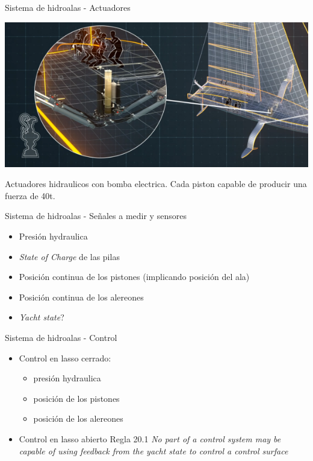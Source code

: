 \documentclass[presentation,aspectratio=169]{beamer}
\begin{document}
\begin{frame}[label={sec:orgcea088c}]{Sistema de hidroalas - Actuadores}

\begin{center}
\includegraphics[height=0.4\textheight]{../../figures/AC75-actuators.png}
\end{center}

Actuadores hidraulicos con bomba electrica. Cada piston capable de producir una fuerza de 40t.
\end{frame}

\begin{frame}[label={sec:orgcf02a2f}]{Sistema de hidroalas - Señales a medir y sensores}
\begin{itemize}
\item Presión hydraulica
\item \emph{State of Charge} de las pilas
\item Posición continua de los pistones (implicando posición del ala)
\item Posición continua de los alereones
\item \emph{Yacht state}?
\end{itemize}
\end{frame}



\begin{frame}[label={sec:orgce68c92}]{Sistema de hidroalas - Control}
\begin{itemize}
\item Control en \alert{lasso cerrado}:
\begin{itemize}
\item presión hydraulica
\item posición de los pistones
\item posición de los alereones
\end{itemize}
\item Control en \alert{lasso abierto} Regla 20.1 \emph{No part of a control system may be capable of using feedback from the yacht state to control a control surface}
\end{itemize}
\end{frame}
\end{document}
